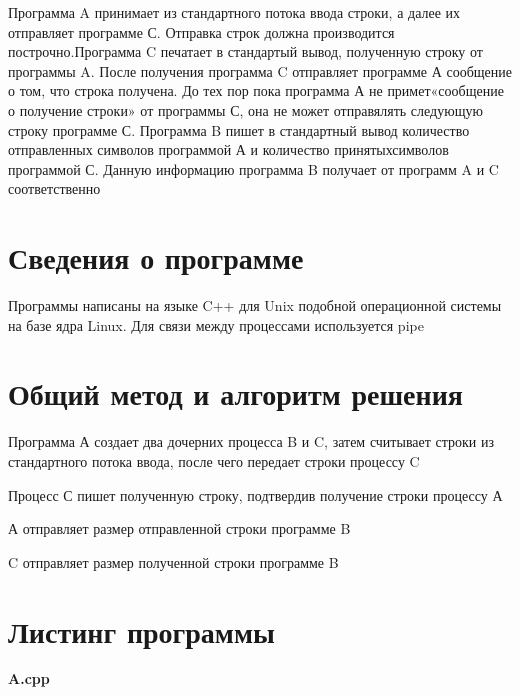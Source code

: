 \documentclass[pdf, unicode, 12pt, a4paper,oneside,fleqn]{article}
\begin{document}
Программа A принимает из стандартного потока ввода строки, а далее их отправляет программе С. Отправка строк должна производится построчно.Программа C печатает в стандартый вывод, полученную строку от программы A. После получения программа C отправляет программе А сообщение о том, что строка получена. До тех пор пока программа А не примет«сообщение о получение строки» от программы С, она не может отправялять следующую строку программе С.
Программа B пишет в стандартный вывод количество отправленных символов программой А и количество принятыхсимволов программой С. Данную информацию программа B получает от программ A и C соответственно

\section{Сведения о программе}

Программы написаны на языке C++ для Unix подобной операционной системы на базе ядра Linux.
Для связи между процессами используется pipe

\section{Общий метод и алгоритм решения}
Программа А создает два дочерних процесса B и C, затем считывает строки из стандартного потока ввода, после чего передает строки процессу C

Процесс С пишет полученную строку, подтвердив получение строки процессу А

А отправляет размер отправленной строки программе B

C отправляет размер полученной строки программе B


\section{Листинг программы}

{\large\textbf{A.cpp}}
\end{document}
